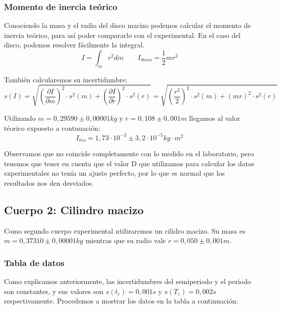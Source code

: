 \documentclass[12pt, a4paper, titlepage]{article}
\begin{document}
  \subsubsection{Momento de inercia teórico}

  Conociendo la masa y el radio del disco macizo podemos calcular el momento de inercia teórico, para así poder compararlo con el experimental. En el caso del disco, podemos resolver fácilmente la integral.
  \begin{equation}
    I = \int_m{r^2 dm} \qquad I_{disco} = \frac{1}{2} m r^2 \label{ec:minerciateo}
  \end{equation}

  También calcularemos su incertidumbre:
  \begin{equation}
    s(I) = \sqrt{\left(\frac{\partial I}{\partial m}\right)^2 \cdot s^2(m) + \left(\frac{\partial I}{\partial r}\right)^2 \cdot s^2(r)} = \sqrt{\left(\frac{r^2}{2}\right)^2 \cdot s^2(m) + \left(mr\right)^2 \cdot s^2(r)} \label{ec:sminerciateo}
  \end{equation}

  Utilizando $m = 0,29590 \pm 0,00001 kg$ y $r = 0,108 \pm 0,001m$ llegamos al valor téorico expuesto a contnuación:
  \begin{equation*}
    I_{teo} = 1,73 \cdot 10^{-3} \pm 3,2 \cdot 10^{-5} kg \cdot m^2
  \end{equation*}

  Observamos que no coincide completamente con lo medido en el laboratorio, pero tenemos que tener en cuenta que el valor D que utilizamos para calcular los datos experimentales no tenía un ajuste perfecto, por lo que es normal que los resultados nos den desviados.

  \newpage
  \subsection{Cuerpo 2: Cilindro macizo}

  Como segundo cuerpo experimental utilizaremos un cilidro macizo. Su masa es $m = 0,37310 \pm 0,00001 kg$ mientras que su radio vale $r = 0,050 \pm 0,001 m$.

  \subsubsection{Tabla de datos}

  Como explicamos anteriormente, las incertidumbres del semiperiodo y el periodo son constantes, y sus valores son $s(t_c) = 0,001s$ y $s(T_c) = 0,002s$ respectivamente. Procedemos a mostrar los datos en la tabla a continuación:
\end{document}
